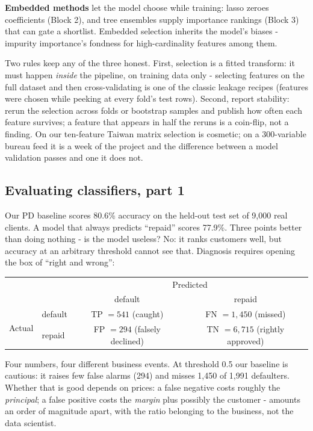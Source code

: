 \documentclass[11pt,a4paper]{article}
\begin{document}
\textbf{Embedded methods} let the model choose while training: lasso
zeroes coefficients (Block 2), and tree ensembles supply importance
rankings (Block 3) that can gate a shortlist. Embedded selection
inherits the model's biases - impurity importance's fondness for
high-cardinality features among them.

Two rules keep any of the three honest. First, selection is a fitted
transform: it must happen \emph{inside} the pipeline, on training data
only - selecting features on the full dataset and then cross-validating
is one of the classic leakage recipes (features were chosen while
peeking at every fold's test rows). Second, report stability: rerun the
selection across folds or bootstrap samples and publish how often each
feature survives; a feature that appears in half the reruns is a
coin-flip, not a finding. On our ten-feature Taiwan matrix selection is
cosmetic; on a 300-variable bureau feed it is a week of the project and
the difference between a model validation passes and one it does not.

\subsection{Evaluating classifiers, part 1}
\label{sec:eval1}
Our PD baseline scores 80.6\% accuracy on the held-out test set of
9{,}000 real clients. A model that always predicts ``repaid'' scores
77.9\%. Three
points better than doing nothing - is the model useless? No: it ranks
customers well, but accuracy at an arbitrary threshold cannot see that.
Diagnosis requires opening the box of ``right and wrong'':

\begin{center}\small
\begin{tabular}{@{}ll|cc@{}}
\toprule
 & & \multicolumn{2}{c}{Predicted} \\
 & & default & repaid \\
\midrule
\multirow{2}{*}{Actual}
 & default & TP $= 541$ (caught) & FN $= 1{,}450$ (missed) \\
 & repaid & FP $= 294$ (falsely declined) & TN $= 6{,}715$ (rightly approved) \\
\bottomrule
\end{tabular}
\end{center}

Four numbers, four different business events. At threshold 0.5 our
baseline is cautious: it raises few false alarms (294) and misses
1{,}450 of 1{,}991 defaulters. Whether that is good depends on prices: a false negative
costs roughly the \emph{principal}; a false positive costs the
\emph{margin} plus possibly the customer - amounts an order of magnitude
apart, with the ratio belonging to the business, not the data scientist.
\end{document}
